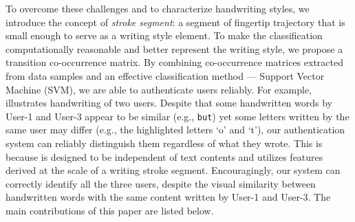  
To overcome these challenges and to characterize handwriting styles, we introduce the concept of \textit{stroke segment}: a segment of fingertip trajectory that is small enough to serve as a writing style element.
To make the classification computationally reasonable and better represent the writing style, we propose a transition co-occurrence matrix. %
 By combining co-occurrence matrices extracted from data samples and an effective classification method --- Support Vector Machine (SVM), we are able to authenticate users reliably.  For example,   illustrates handwriting of two users. Despite that some handwritten words by User-1 and User-3 appear to be similar (e.g., \texttt{but}) yet some letters written by the same user may differ (e.g., the highlighted letters `o' and `t'), our authentication system can reliably distinguish them regardless of what they wrote. This is because \CiT is designed to be independent of text contents and utilizes features derived at the scale of a writing stroke segment.
Encouragingly, our system can correctly identify all the three users, despite the visual similarity between handwritten words with the same content written by User-1 and User-3. %
%
%
The main contributions of this paper are listed below. 
